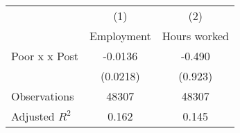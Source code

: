 {
\def\sym#1{\ifmmode^{#1}\else\(^{#1}\)\fi}
\begin{tabular}{l*{2}{c}}
\hline\hline
                &\multicolumn{1}{c}{(1)}&\multicolumn{1}{c}{(2)}\\
                &\multicolumn{1}{c}{Employment}&\multicolumn{1}{c}{Hours worked}\\
\hline
Poor x  x Post  &  -0.0136         &   -0.490         \\
                & (0.0218)         &  (0.923)         \\
\hline
Observations    &    48307         &    48307         \\
Adjusted \(R^{2}\)&    0.162         &    0.145         \\
\hline\hline
\end{tabular}
}
